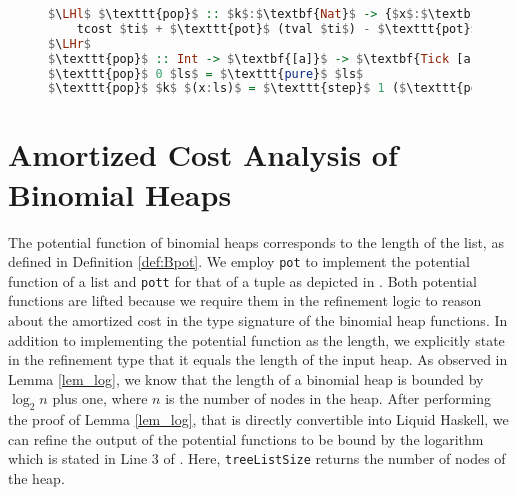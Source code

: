 \documentclass{clmthesis}
\begin{document}
\begin{figure}[h]
\begin{lstlisting}[mathescape=true, language=haskell, caption={Amortized cost analysis of \texttt{pop}.},captionpos=b, label=fig:pop]	
$\LHl$ $\texttt{pop}$ :: $k$:$\textbf{Nat}$ -> {$x$:$\textbf{[a]}$ | $k$ $\leq$ $\texttt{len}$ $xs$} -> {$ti$:$\textbf{Tick [a]}$ | 
	tcost $ti$ + $\texttt{pot}$ (tval $ti$) - $\texttt{pot}$ $ls$ $<$ 1} 
$\LHr$
$\texttt{pop}$ :: Int -> $\textbf{[a]}$ -> $\textbf{Tick [a]}$ 
$\texttt{pop}$ 0 $ls$ = $\texttt{pure}$ $ls$
$\texttt{pop}$ $k$ $(x:ls)$ = $\texttt{step}$ 1 ($\texttt{pop}$ ($k-1$) $ls$)
\end{lstlisting}
\end{figure}

\FloatBarrier

\section{Amortized Cost Analysis of Binomial Heaps}\label{sec:amortizedbi}
The potential function of binomial heaps corresponds to the length of the list, as defined in Definition \ref{def:Bpot}. We employ \texttt{pot} to implement the potential function of a list and \texttt{pott} for that of a tuple as depicted in . Both potential functions are lifted because we require them in the refinement logic to reason about the amortized cost in the type signature of the binomial heap functions. In addition to implementing the potential function as the length, we explicitly state in the refinement type that it equals the length of the input heap. As observed in Lemma \ref{lem_log}, we know that the length of a binomial heap is bounded by $\log_2 n$ plus one, where $n$ is the number of nodes in the heap. After performing the proof of Lemma \ref{lem_log}, that is directly convertible into Liquid Haskell, we can refine the output of the potential functions to be bound by the logarithm which is stated in Line 3 of . Here, \texttt{treeListSize} returns the number of nodes of the heap.
\end{document}
